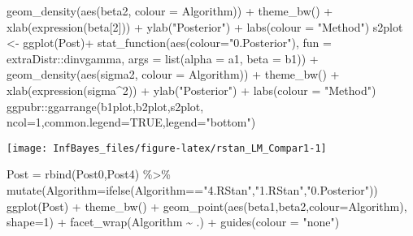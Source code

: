 \documentclass[
]{book}
\newenvironment{Shaded}{\begin{snugshade}}{\end{snugshade}}
\newcommand{\AttributeTok}[1]{\textcolor[rgb]{0.77,0.63,0.00}{#1}}
\newcommand{\ConstantTok}[1]{\textcolor[rgb]{0.00,0.00,0.00}{#1}}
\newcommand{\DecValTok}[1]{\textcolor[rgb]{0.00,0.00,0.81}{#1}}
\newcommand{\FunctionTok}[1]{\textcolor[rgb]{0.00,0.00,0.00}{#1}}
\newcommand{\NormalTok}[1]{#1}
\newcommand{\OtherTok}[1]{\textcolor[rgb]{0.56,0.35,0.01}{#1}}
\newcommand{\SpecialCharTok}[1]{\textcolor[rgb]{0.00,0.00,0.00}{#1}}
\newcommand{\StringTok}[1]{\textcolor[rgb]{0.31,0.60,0.02}{#1}}
\begin{document}
\begin{Shaded}
\begin{Highlighting}[]
  \FunctionTok{geom\_density}\NormalTok{(}\FunctionTok{aes}\NormalTok{(beta2, }\AttributeTok{colour =}\NormalTok{ Algorithm)) }\SpecialCharTok{+} \FunctionTok{theme\_bw}\NormalTok{() }\SpecialCharTok{+}
  \FunctionTok{xlab}\NormalTok{(}\FunctionTok{expression}\NormalTok{(beta[}\DecValTok{2}\NormalTok{])) }\SpecialCharTok{+} \FunctionTok{ylab}\NormalTok{(}\StringTok{"Posterior"}\NormalTok{) }\SpecialCharTok{+} \FunctionTok{labs}\NormalTok{(}\AttributeTok{colour =} \StringTok{"Method"}\NormalTok{)}
\NormalTok{s2plot }\OtherTok{\textless{}{-}} \FunctionTok{ggplot}\NormalTok{(Post)}\SpecialCharTok{+}
  \FunctionTok{stat\_function}\NormalTok{(}\FunctionTok{aes}\NormalTok{(}\AttributeTok{colour=}\StringTok{"0.Posterior"}\NormalTok{), }\AttributeTok{fun =}\NormalTok{ extraDistr}\SpecialCharTok{::}\NormalTok{dinvgamma, }\AttributeTok{args =} \FunctionTok{list}\NormalTok{(}\AttributeTok{alpha =}\NormalTok{ a1, }\AttributeTok{beta =}\NormalTok{ b1)) }\SpecialCharTok{+}
  \FunctionTok{geom\_density}\NormalTok{(}\FunctionTok{aes}\NormalTok{(sigma2, }\AttributeTok{colour =}\NormalTok{ Algorithm)) }\SpecialCharTok{+} \FunctionTok{theme\_bw}\NormalTok{() }\SpecialCharTok{+}
  \FunctionTok{xlab}\NormalTok{(}\FunctionTok{expression}\NormalTok{(sigma}\SpecialCharTok{\^{}}\DecValTok{2}\NormalTok{)) }\SpecialCharTok{+} \FunctionTok{ylab}\NormalTok{(}\StringTok{"Posterior"}\NormalTok{) }\SpecialCharTok{+} \FunctionTok{labs}\NormalTok{(}\AttributeTok{colour =} \StringTok{"Method"}\NormalTok{)}
\NormalTok{ggpubr}\SpecialCharTok{::}\FunctionTok{ggarrange}\NormalTok{(b1plot,b2plot,s2plot,}
                  \AttributeTok{ncol=}\DecValTok{1}\NormalTok{,}\AttributeTok{common.legend=}\ConstantTok{TRUE}\NormalTok{,}\AttributeTok{legend=}\StringTok{"bottom"}\NormalTok{)}
\end{Highlighting}
\end{Shaded}

\begin{center}\texttt{[image: InfBayes\_files/figure-latex/rstan\_LM\_Compar1-1]} \end{center}

\begin{Shaded}
\begin{Highlighting}[]
\NormalTok{Post }\OtherTok{=} \FunctionTok{rbind}\NormalTok{(Post0,Post4) }\SpecialCharTok{\%\textgreater{}\%}
  \FunctionTok{mutate}\NormalTok{(}\AttributeTok{Algorithm=}\FunctionTok{ifelse}\NormalTok{(Algorithm}\SpecialCharTok{==}\StringTok{"4.RStan"}\NormalTok{,}\StringTok{"1.RStan"}\NormalTok{,}\StringTok{"0.Posterior"}\NormalTok{))}
\FunctionTok{ggplot}\NormalTok{(Post) }\SpecialCharTok{+} \FunctionTok{theme\_bw}\NormalTok{() }\SpecialCharTok{+}
  \FunctionTok{geom\_point}\NormalTok{(}\FunctionTok{aes}\NormalTok{(beta1,beta2,}\AttributeTok{colour=}\NormalTok{Algorithm), }\AttributeTok{shape=}\DecValTok{1}\NormalTok{) }\SpecialCharTok{+}
  \FunctionTok{facet\_wrap}\NormalTok{(Algorithm }\SpecialCharTok{\textasciitilde{}}\NormalTok{ .) }\SpecialCharTok{+} \FunctionTok{guides}\NormalTok{(}\AttributeTok{colour =} \StringTok{"none"}\NormalTok{)}
\end{Highlighting}
\end{Shaded}
\end{document}
